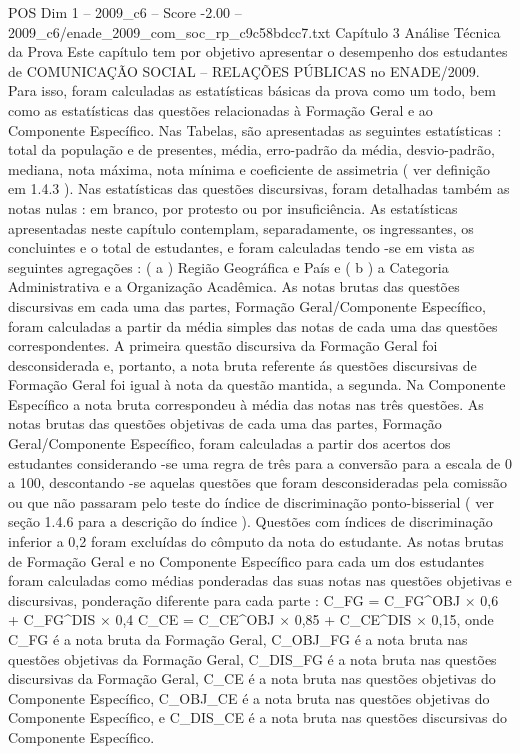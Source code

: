 \begin{textsample}{POS Dim 1 – 2009\_c6 – Score -2.00 – 2009\_c6/enade\_2009\_com\_soc\_rp\_c9c58bdcc7.txt}  \label{ex:f1_pos_224}
Capítulo 3 Análise Técnica da Prova Este capítulo tem por objetivo apresentar o desempenho dos estudantes de COMUNICAÇÃO SOCIAL – RELAÇÕES PÚBLICAS no ENADE/2009.
Para isso, foram calculadas as estatísticas básicas da prova como um todo, bem como as estatísticas das questões relacionadas à Formação Geral e ao Componente Específico.
Nas Tabelas, são apresentadas as seguintes estatísticas : total da população e de presentes, média, erro-padrão da média, desvio-padrão, mediana, nota máxima, nota mínima e coeficiente de assimetria ( ver definição em 1.4.3 ).
Nas estatísticas das questões discursivas, foram detalhadas também as notas nulas : em branco, por protesto ou por insuficiência.
As estatísticas apresentadas neste capítulo contemplam, separadamente, os ingressantes, os concluintes e o total de estudantes, e foram calculadas tendo -se em vista as seguintes agregações : ( a ) Região Geográfica e País e ( b ) a Categoria Administrativa e a Organização Acadêmica.
As notas brutas das questões discursivas em cada uma das partes, Formação Geral/Componente Específico, foram calculadas a partir da média simples das notas de cada uma das questões correspondentes.
A primeira questão discursiva da Formação Geral foi desconsiderada e, portanto, a nota bruta referente ás questões discursivas de Formação Geral foi igual à nota da questão mantida, a segunda.
Na Componente Específico a nota bruta correspondeu à média das notas nas três questões.
As notas brutas das questões objetivas de cada uma das partes, Formação Geral/Componente Específico, foram calculadas a partir dos acertos dos estudantes considerando -se uma regra de três para a conversão para a escala de 0 a 100, descontando -se aquelas questões que foram desconsideradas pela comissão ou que não passaram pelo teste do índice de discriminação ponto-bisserial ( ver seção 1.4.6 para a descrição do índice ).
Questões com índices de discriminação inferior a 0,2 foram excluídas do cômputo da nota do estudante.
As notas brutas de Formação Geral e no Componente Específico para cada um dos estudantes foram calculadas como médias ponderadas das suas notas nas questões objetivas e discursivas, ponderação diferente para cada parte : C\_FG = C\_FG\textasciicircum{}OBJ × 0,6 + C\_FG\textasciicircum{}DIS × 0,4 C\_CE = C\_CE\textasciicircum{}OBJ × 0,85 + C\_CE\textasciicircum{}DIS × 0,15, onde C\_FG é a nota bruta da Formação Geral, C\_OBJ\_FG é a nota bruta nas questões objetivas da Formação Geral, C\_DIS\_FG é a nota bruta nas questões discursivas da Formação Geral, C\_CE é a nota bruta nas questões objetivas do Componente Específico, C\_OBJ\_CE é a nota bruta nas questões objetivas do Componente Específico, e C\_DIS\_CE é a nota bruta nas questões discursivas do Componente Específico.

\end{textsample}
